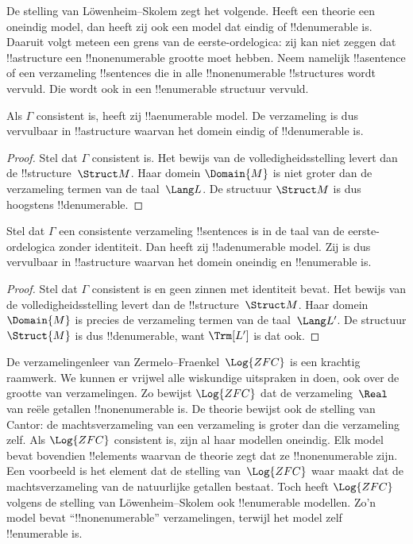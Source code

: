 \documentclass[../../../include/open-logic-section]{subfiles}
\begin{document}

De stelling van L\"owenheim--Skolem zegt het volgende. Heeft een theorie
een oneindig model, dan heeft zij ook een model dat eindig of
!!{denumerable} is. Daaruit volgt meteen een grens van de
eerste-ordelogica: zij kan niet zeggen dat !!a{structure} een
!!{nonenumerable} grootte moet hebben. Neem namelijk !!a{sentence} of een
verzameling !!{sentence}s die in alle !!{nonenumerable} !!{structure}s
wordt vervuld. Die wordt ook in een !!{enumerable} structuur vervuld.

\begin{thm} 
 Als $\Gamma$ consistent is, heeft zij
!!a{enumerable} model. De verzameling is dus vervulbaar in !!a{structure}
waarvan het domein eindig of !!{denumerable} is.
\end{thm}

\begin{proof}
Stel dat $\Gamma$ consistent is. Het bewijs van de volledigheidsstelling
levert dan de !!{structure}~$\Struct M$. Haar domein $\Domain{M}$ is niet
groter dan de verzameling termen van de taal~$\Lang L$. De structuur
$\Struct M$ is dus hoogstens !!{denumerable}.
\end{proof}

\begin{thm}
 Stel dat $\Gamma$ een consistente verzameling
!!{sentence}s is in de taal van de eerste-ordelogica zonder identiteit.
Dan heeft zij !!a{denumerable} model. Zij is dus vervulbaar in
!!a{structure} waarvan het domein oneindig en !!{enumerable} is.
\end{thm}

\begin{proof}
Stel dat $\Gamma$ consistent is en geen zinnen met identiteit bevat. Het
bewijs van de volledigheidsstelling levert dan de !!{structure}~$\Struct M$.
Haar domein $\Domain{M}$ is precies de verzameling termen van de
taal~$\Lang L'$. De structuur $\Struct{M}$ is dus !!{denumerable}, want
$\Trm[L']$ is dat ook.
\end{proof}

\begin{ex}
De verzamelingenleer van Zermelo--Fraenkel~$\Log{ZFC}$ is een krachtig
raamwerk. We kunnen er vrijwel alle wiskundige uitspraken in doen, ook
over de grootte van verzamelingen. Zo bewijst $\Log{ZFC}$ dat de
verzameling~$\Real$ van reële getallen !!{nonenumerable} is. De theorie
bewijst ook de stelling van Cantor: de machtsverzameling van een
verzameling is groter dan die verzameling zelf. Als $\Log{ZFC}$
consistent is, zijn al haar modellen oneindig. Elk model bevat bovendien
!!{element}s waarvan de theorie zegt dat ze !!{nonenumerable} zijn. Een
voorbeeld is het element dat de stelling van~$\Log{ZFC}$ waar maakt dat
de machtsverzameling van de natuurlijke getallen bestaat. Toch heeft
$\Log{ZFC}$ volgens de stelling van L\"owenheim--Skolem ook
!!{enumerable} modellen. Zo'n model bevat ``!!{nonenumerable}''
verzamelingen, terwijl het model zelf !!{enumerable} is.
\end{ex}
\end{document}
